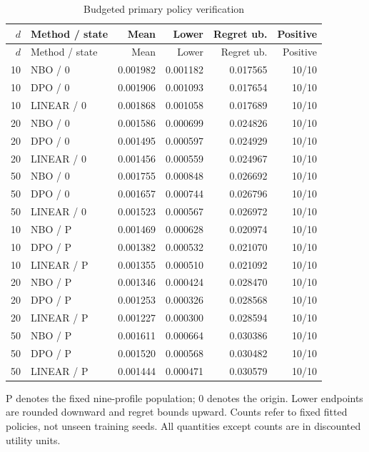 \begingroup\small\setlength{\tabcolsep}{4pt}
\begin{longtable}{rlrrrr}
\caption{Budgeted primary policy verification}\label{tab:r12primary}\\
\toprule
$d$ & Method / state & Mean & Lower & Regret ub. & Positive\\\midrule
\endfirsthead
\toprule
$d$ & Method / state & Mean & Lower & Regret ub. & Positive\\\midrule
\endhead
10 & NBO / 0 & 0.001982 & 0.001182 & 0.017565 & 10/10\\
10 & DPO / 0 & 0.001906 & 0.001093 & 0.017654 & 10/10\\
10 & LINEAR / 0 & 0.001868 & 0.001058 & 0.017689 & 10/10\\
20 & NBO / 0 & 0.001586 & 0.000699 & 0.024826 & 10/10\\
20 & DPO / 0 & 0.001495 & 0.000597 & 0.024929 & 10/10\\
20 & LINEAR / 0 & 0.001456 & 0.000559 & 0.024967 & 10/10\\
50 & NBO / 0 & 0.001755 & 0.000848 & 0.026692 & 10/10\\
50 & DPO / 0 & 0.001657 & 0.000744 & 0.026796 & 10/10\\
50 & LINEAR / 0 & 0.001523 & 0.000567 & 0.026972 & 10/10\\
10 & NBO / P & 0.001469 & 0.000628 & 0.020974 & 10/10\\
10 & DPO / P & 0.001382 & 0.000532 & 0.021070 & 10/10\\
10 & LINEAR / P & 0.001355 & 0.000510 & 0.021092 & 10/10\\
20 & NBO / P & 0.001346 & 0.000424 & 0.028470 & 10/10\\
20 & DPO / P & 0.001253 & 0.000326 & 0.028568 & 10/10\\
20 & LINEAR / P & 0.001227 & 0.000300 & 0.028594 & 10/10\\
50 & NBO / P & 0.001611 & 0.000664 & 0.030386 & 10/10\\
50 & DPO / P & 0.001520 & 0.000568 & 0.030482 & 10/10\\
50 & LINEAR / P & 0.001444 & 0.000471 & 0.030579 & 10/10\\
\bottomrule\end{longtable}
\noindent P denotes the fixed nine-profile population; 0 denotes the origin. Lower endpoints are rounded downward and regret bounds upward. Counts refer to fixed fitted policies, not unseen training seeds. All quantities except counts are in discounted utility units.
\endgroup
